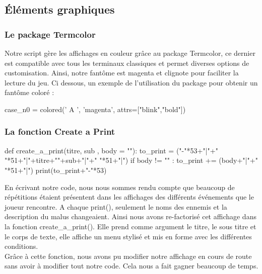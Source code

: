 \documentclass[titlepage]{report}
\begin{document}
{\subsection{Éléments graphiques}
\subsubsection{Le package Termcolor}
\begin{figure}[H]
\begin{center}
    \end{center}
\end{figure}
\hspace*{0.5cm}Notre script gère les affichages en couleur grâce au package Termcolor, ce dernier est compatible avec tous les terminaux classiques et permet diverses options de customisation. Ainsi, notre fantôme est magenta et clignote pour faciliter la lecture du jeu. Ci dessous, un exemple de l'utilisation du package pour obtenir un fantôme coloré :\\ 
\begin{python}
case_n0 = colored(' A ', 'magenta', attrs=["blink","bold"]) 
\end{python}
\subsubsection{La fonction Create a Print}
\begin{python}
def create_a_print(titre, sub , body = ""):
    to_print = ("-"*53+"\n|"+" "*51+"|\n"+titre+"\n"+sub+"\n|"+" "*51+"|\n")
    if body != "" :
        to_print += (body+"\n|"+" "*51+"|\n")
    print(to_print+"-"*53)
\end{python}
\vspace*{0.5cm}
\hspace*{0.5cm}En écrivant notre code, nous nous sommes rendu compte que beaucoup de répétitions étaient présentent dans les affichages des différents événements que le joueur rencontre. A chaque print(), seulement le noms des ennemis et la description du malus changeaient. Ainsi nous avons re-factorisé cet affichage dans la fonction create\_a\_print(). Elle prend comme argument le titre, le sous titre et le corps de texte, elle affiche un menu stylisé et mis en forme avec les différentes conditions.\\
\hspace*{0.5cm}Grâce à cette fonction, nous avons pu modifier notre affichage en cours de route sans avoir à modifier tout notre code. Cela nous a fait gagner beaucoup de temps. 

}
\end{document}
